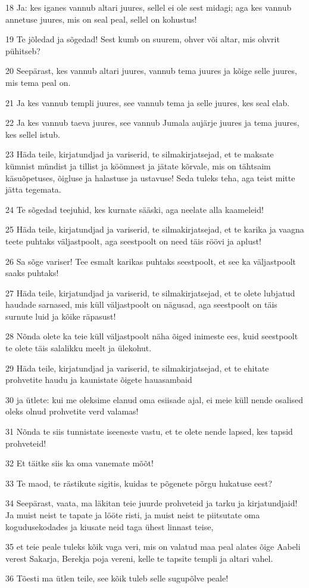 \par 18 Ja: kes iganes vannub altari juures, sellel ei ole sest midagi; aga kes vannub annetuse juures, mis on seal peal, sellel on kohustus!
\par 19 Te jõledad ja sõgedad! Sest kumb on suurem, ohver või altar, mis ohvrit pühitseb?
\par 20 Seepärast, kes vannub altari juures, vannub tema juures ja kõige selle juures, mis tema peal on.
\par 21 Ja kes vannub templi juures, see vannub tema ja selle juures, kes seal elab.
\par 22 Ja kes vannub taeva juures, see vannub Jumala aujärje juures ja tema juures, kes sellel istub.
\par 23 Häda teile, kirjatundjad ja variserid, te silmakirjatsejad, et te maksate kümnist mündist ja tillist ja köömnest ja jätate kõrvale, mis on tähtsaim käsuõpetuses, õigluse ja halastuse ja ustavuse! Seda tuleks teha, aga teist mitte jätta tegemata.
\par 24 Te sõgedad teejuhid, kes kurnate sääski, aga neelate alla kaameleid!
\par 25 Häda teile, kirjatundjad ja variserid, te silmakirjatsejad, et te karika ja vaagna teete puhtaks väljastpoolt, aga seestpoolt on need täis röövi ja aplust!
\par 26 Sa sõge variser! Tee esmalt karikas puhtaks seestpoolt, et see ka väljastpoolt saaks puhtaks!
\par 27 Häda teile, kirjatundjad ja variserid, te silmakirjatsejad, et te olete lubjatud haudade sarnased, mis küll väljastpoolt on nägusad, aga seestpoolt on täis surnute luid ja kõike räpasust!
\par 28 Nõnda olete ka teie küll väljastpoolt näha õiged inimeste ees, kuid seestpoolt te olete täis salalikku meelt ja ülekohut.
\par 29 Häda teile, kirjatundjad ja variserid, te silmakirjatsejad, et te ehitate prohvetite haudu ja kaunistate õigete hauasambaid
\par 30 ja ütlete: kui me oleksime elanud oma esiisade ajal, ei meie küll nende osalised oleks olnud prohvetite verd valamas!
\par 31 Nõnda te siis tunnistate iseeneste vastu, et te olete nende lapsed, kes tapsid prohveteid!
\par 32 Et täitke siis ka oma vanemate mõõt!
\par 33 Te maod, te rästikute sigitis, kuidas te põgenete põrgu hukatuse eest?
\par 34 Seepärast, vaata, ma läkitan teie juurde prohveteid ja tarku ja kirjatundjaid! Ja muist neist te tapate ja lööte risti, ja muist neist te piitsutate oma kogudusekodades ja kiusate neid taga ühest linnast teise,
\par 35 et teie peale tuleks kõik vaga veri, mis on valatud maa peal alates õige Aabeli verest Sakarja, Berekja poja vereni, kelle te tapsite templi ja altari vahel.
\par 36 Tõesti ma ütlen teile, see kõik tuleb selle sugupõlve peale!

